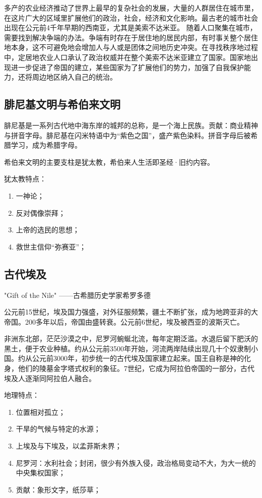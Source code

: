 多产的农业经济推动了世界上最早的复杂社会的发展，大量的人群居住在城市里，在这片广大的区域里扩展他们的政治，社会，经济和文化影响。最古老的城市社会出现在公元前4千年早期的西南亚，尤其是美索不达米亚。
随着人口聚集在城市，需要找到解决争端的办法。争端有时存在于居住地的居民内部，有时事关整个居住地本身，这不可避免地会增加人与人或是团体之间地历史冲突。在寻找秩序地过程中，定居地农业人口承认了政治权威并在整个美索不达米亚建立了国家。国家地出现进一步促进了帝国的建立，某些国家为了扩展他们的势力，加强了自我保护能力，还将周边地区纳入自己的统治。


\subsection{腓尼基文明与希伯来文明}
腓尼基是一系列古代地中海东岸的城邦的总称，是一个海上民族。贡献：商业精神与拼音字母。腓尼基在闪米特语中为“紫色之国”，盛产紫色染料。拼音字母后被希腊学习，成为希腊字母。

希伯来文明的主要支柱是犹太教，希伯来人生活即圣经·旧约内容。

犹太教特点：
\begin{enumerate}
    \item 一神论；
    \item 反对偶像崇拜；
    \item 上帝的选民的思想；
    \item 救世主信仰“弥赛亚”；
\end{enumerate}

\subsection{古代埃及}
"Gift of the Nile" ——古希腊历史学家希罗多德

公元前15世纪，埃及国力强盛，对外征服频繁，疆土不断扩张，成为地跨亚非的大帝国。200多年以后，帝国由盛转衰。公元前6世纪，埃及被西亚的波斯灭亡。

非洲东北部，茫茫沙漠之中，尼罗河蜿蜒北流，每年定期泛滥。水退后留下肥沃的黑土，便于农业种植。约从公元前3500年开始，河流两岸陆续出现几十个奴隶制小国。约从公元前3000年，初步统一的古代埃及国家建立起来。国王自称是神的化身，他们的陵墓金字塔式权利的象征。7世纪，它成为阿拉伯帝国的一部分，古代埃及人逐渐同阿拉伯人融合。

地理特点：
\begin{enumerate}
    \item 位置相对孤立；
    \item 干旱的气候与特定的水源；
    \item 上埃及与下埃及，以孟菲斯未界；
    \item 尼罗河：水利社会；封闭，很少有外族入侵，政治格局变动不大，为大一统的中央集权国家；
    \item 贡献：象形文字，纸莎草；
\end{enumerate}

